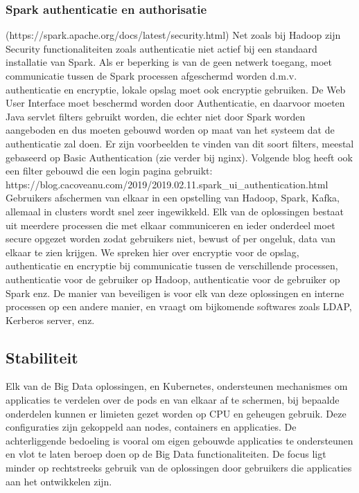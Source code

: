 \subsubsection {Spark authenticatie en authorisatie} (https://spark.apache.org/docs/latest/security.html) \newline
Net zoals bij Hadoop zijn Security functionaliteiten zoals authenticatie niet actief bij een standaard installatie van Spark. Als er beperking is van de geen netwerk toegang, moet communicatie tussen de Spark processen afgeschermd worden d.m.v. authenticatie en encryptie, lokale opslag moet ook encryptie gebruiken. De Web User Interface moet beschermd worden door Authenticatie, en daarvoor moeten Java servlet filters gebruikt worden, die echter niet door Spark worden aangeboden en dus moeten gebouwd worden op maat van het systeem dat de authenticatie zal doen.
Er zijn voorbeelden te vinden van dit soort filters, meestal gebaseerd op Basic Authentication (zie verder bij nginx). Volgende blog heeft ook een filter gebouwd die een login pagina gebruikt: \newline https://blog.cacoveanu.com/2019/2019.02.11.spark\_ui\_authentication.html
\newline
\newline
Gebruikers afschermen van elkaar in een opstelling van Hadoop, Spark, Kafka, allemaal in clusters wordt snel zeer ingewikkeld. Elk van de oplossingen bestaat uit meerdere processen die met elkaar communiceren en ieder onderdeel moet secure opgezet worden zodat gebruikers niet, bewust of per ongeluk, data van elkaar te zien krijgen. We spreken hier over encryptie voor de opslag, authenticatie en encryptie bij communicatie tussen de verschillende processen, authenticatie voor de gebruiker op Hadoop, authenticatie voor de gebruiker op Spark enz.
De manier van beveiligen is voor elk van deze oplossingen en interne processen op een andere manier, en vraagt om bijkomende softwares zoals LDAP, Kerberos server, enz.

\subsection{Stabiliteit}

Elk van de Big Data oplossingen, en Kubernetes, ondersteunen mechanismes om applicaties te verdelen over de pods en van elkaar af te schermen, bij bepaalde onderdelen kunnen er limieten gezet worden op CPU en geheugen gebruik. Deze configuraties zijn gekoppeld aan nodes, containers en applicaties. De achterliggende bedoeling is vooral om eigen gebouwde applicaties te ondersteunen en vlot te laten beroep doen op de Big Data functionaliteiten. De focus ligt minder op rechtstreeks gebruik van de oplossingen door gebruikers die applicaties aan het ontwikkelen zijn.

